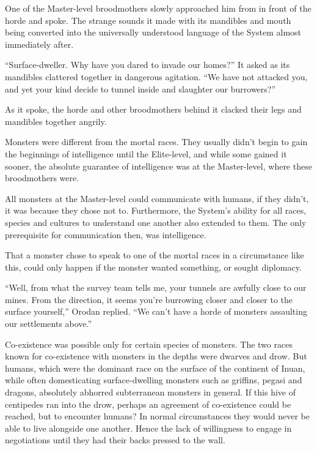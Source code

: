\documentclass[a4paper,10pt]{book}
\begin{document}
One of the Master-level broodmothers slowly approached him from in front of the horde and spoke. The strange sounds it made with its mandibles and mouth being converted into the universally understood language of the System almost immediately after.\par
“Surface-dweller. Why have you dared to invade our homes?” It asked as its mandibles clattered together in dangerous agitation. “We have not attacked you, and yet your kind decide to tunnel inside and slaughter our burrowers?”\par
As it spoke, the horde and other broodmothers behind it clacked their legs and mandibles together angrily.\par
Monsters were different from the mortal races. They usually didn’t begin to gain the beginnings of intelligence until the Elite-level, and while some gained it sooner, the absolute guarantee of intelligence was at the Master-level, where these broodmothers were.\par
All monsters at the Master-level could communicate with humans, if they didn’t, it was because they chose not to. Furthermore, the System’s ability for all races, species and cultures to understand one another also extended to them. The only prerequisite for communication then, was intelligence.\par
That a monster chose to speak to one of the mortal races in a circumstance like this, could only happen if the monster wanted something, or sought diplomacy.\par
“Well, from what the survey team tells me, your tunnels are awfully close to our mines. From the direction, it seems you’re burrowing closer and closer to the surface yourself,” Orodan replied. “We can’t have a horde of monsters assaulting our settlements above.”\par
Co-existence was possible only for certain species of monsters. The two races known for co-existence with monsters in the depths were dwarves and drow. But humans, which were the dominant race on the surface of the continent of Inuan, while often domesticating surface-dwelling monsters such as griffins, pegasi and dragons, absolutely abhorred subterranean monsters in general. If this hive of centipedes ran into the drow, perhaps an agreement of co-existence could be reached, but to encounter humans? In normal circumstances they would never be able to live alongside one another. Hence the lack of willingness to engage in negotiations until they had their backs pressed to the wall.\par
\end{document}
